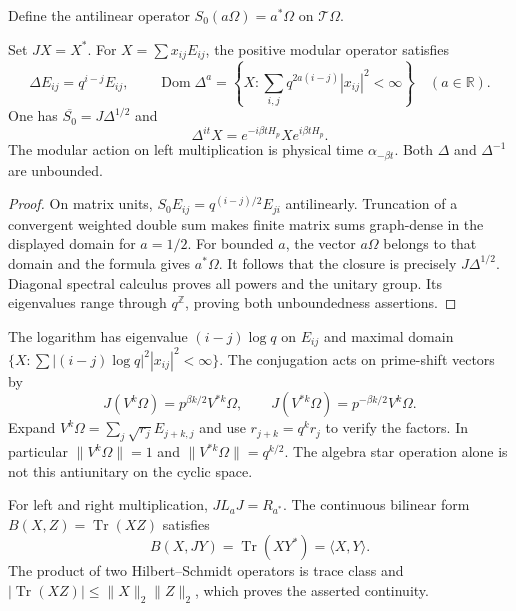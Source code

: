 Define the antilinear operator $S_0(a\Omega)=a^*\Omega$ on $\mathcal
T\Omega$.

\begin{proposition}
\label{v4-arith:traces:prime-modular}
Set $JX=X^*$. For $X=\sum x_{ij}E_{ij}$, the positive modular operator
satisfies
\[
 \Delta E_{ij}=q^{i-j}E_{ij},\qquad
 \operatorname{Dom}\Delta^a
  =\left\{X:\sum_{i,j}q^{2a(i-j)}|x_{ij}|^2<\infty\right\}
       \quad(a\in\mathbb R).
\]
One has $\overline{S_0}=J\Delta^{1/2}$ and
\[
 \Delta^{it}X=e^{-i\beta tH_p}Xe^{i\beta tH_p}.
\]
The modular action on left multiplication is physical time $\alpha_{-\beta
t}$. Both $\Delta$ and $\Delta^{-1}$ are unbounded.
\end{proposition}
\begin{proof}
On matrix units, $S_0E_{ij}=q^{(i-j)/2}E_{ji}$ antilinearly. Truncation of a
convergent weighted double sum makes finite matrix sums graph-dense in the
displayed domain for $a=1/2$. For bounded $a$, the vector $a\Omega$ belongs
to that domain and the formula gives $a^*\Omega$. It follows that the
closure is precisely $J\Delta^{1/2}$. Diagonal spectral calculus proves all
powers and the unitary group. Its eigenvalues range through $q^{\mathbb Z}$,
proving both unboundedness assertions.
\end{proof}

The logarithm has eigenvalue $(i-j)\log q$ on $E_{ij}$ and maximal domain
$\{X:\sum |(i-j)\log q|^2|x_{ij}|^2<\infty\}$. The conjugation acts on
prime-shift vectors by
\[
 J(V^k\Omega)=p^{\beta k/2}V^{*k}\Omega,\qquad
 J(V^{*k}\Omega)=p^{-\beta k/2}V^k\Omega.
\]
Expand $V^k\Omega=\sum_j\sqrt{r_j}E_{j+k,j}$ and use $r_{j+k}=q^kr_j$ to
verify the factors. In particular $\|V^k\Omega\|=1$ and
$\|V^{*k}\Omega\|=q^{k/2}$. The algebra star operation alone is not this
antiunitary on the cyclic space.

For left and right multiplication, $JL_aJ=R_{a^*}$. The continuous bilinear
form $B(X,Z)=\operatorname{Tr}(XZ)$ satisfies
\[
 B(X,JY)=\operatorname{Tr}(XY^*)=\langle X,Y\rangle.
\]
The product of two Hilbert--Schmidt operators is trace class and
$|\operatorname{Tr}(XZ)|\leq\|X\|_2\|Z\|_2$, which proves the asserted
continuity.

